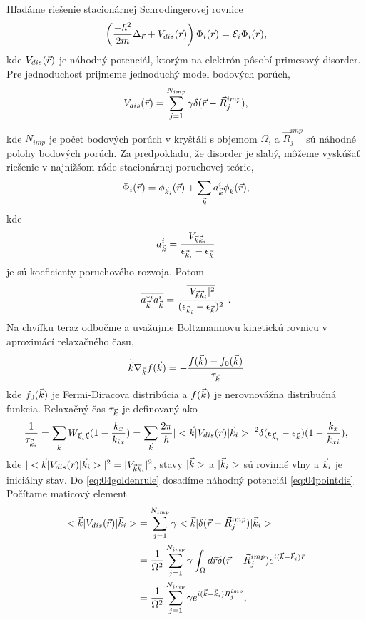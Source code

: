 Hľadáme riešenie stacionárnej Schrodingerovej rovnice
\begin{equation}
\label{eq:04SchrDis2stac}
\left(\frac{-\hbar^2}{2m}\Delta_{\vec{r}} + V_{dis}(\vec{r})\right)\Phi_i(\vec{r}) = \mathcal{E}_i \Phi_{i}(\vec{r})
  \text{,}
\end{equation}
kde $V_{dis}(\vec{r})$ je náhodný potenciál, ktorým na elektrón pôsobí primesový disorder. Pre jednoduchosť prijmeme jednoduchý model bodových porúch,
\begin{align}
\label{eq:04pointdis}
V_{dis}(\vec{r})=\sum_{j=1}^{N_{imp}}\gamma \delta(\vec{r}-\vec R_j^{imp})\text{,}
\end{align}
kde $N_{imp}$ je počet bodových porúch v kryštáli s objemom $\Omega$, a $\vec R^{imp}_j$ sú náhodné polohy bodových porúch.
Za predpokladu, že disorder je slabý, môžeme vyskúšať riešenie v najnižšom ráde stacionárnej poruchovej teórie,
\begin{align}
\label{nulta}
\Phi_i(\vec{r})=\phi_{\vec{k}_i}(\vec{r})+\sum_{\vec{k}} a^i_{\vec{k}} \phi_{\vec{k}}(\vec{r})\text{,}
\end{align}
kde
\begin{equation}
\label{eq:04SchrDis2stac}
a^i_{\vec{k}} = \frac{V_{\vec{k}\vec{k}_i}}{\epsilon_{\vec{k}_i}-\epsilon_{\vec{k}}}
\end{equation}
je sú koeficienty poruchového rozvoja. Potom
\begin{align}
\label{eq:04coef}
\overline{a^{*i}_{\vec{k}}a^i_{\vec{k}}}=
\frac{\overline{|V_{\vec{k}\vec{k}_i}|^2}}{(\epsilon_{\vec{k}_i}-\epsilon_{\vec{k}})^2}
\ \text{.}
\end{align}
Na chvíľku teraz odbočme a uvažujme Boltzmannovu kinetickú rovnicu v aproximácí relaxačného času,
\begin{align}
\dot{\vec{k}}\nabla_{\vec{k}}f(\vec{k})=-\frac{f(\vec{k})-f_0(\vec{k})}{\tau_{\vec{k}}}
\end{align}
kde $f_0(\vec{k})$ je Fermi-Diracova distribúcia a $f(\vec{k})$ je nerovnovážna distribučná funkcia. Relaxačný čas  $\tau_{\vec{k}}$ je definovaný ako
\begin{align}
\label{eq:04goldenrule}
\frac{1}{\tau_{\vec{k}_i}}=\sum_{\vec{k}}W_{\vec{k}_i\vec{k}}(1-\frac{k_x}{k_{ix}}) = \sum_{\vec{k}}\frac{2\pi}{\hbar}|<\vec{k}|V_{dis}(\vec{r})|\vec{k}_i>|^2\delta(\epsilon_{\vec{k}_i}-\epsilon_{\vec{k}})(1-\frac{k_x}{k_{xi}}) \text{,}
\end{align}
kde $|<\vec{k}|V_{dis}(\vec{r})|\vec{k}_i>|^2=|V_{\vec{k}\vec{k}_i}|^2$,
 stavy $|\vec{k}>$ a $|\vec{k}_i>$ sú rovinné vlny  a  $\vec{k}_i$ je iniciálny stav.
Do \eqref{eq:04goldenrule} dosadíme náhodný potenciál \eqref{eq:04pointdis}
Počítame maticový element
\begin{align}
\label{eq:04vdisElement}
\notag
<\vec{k}|V_{dis}(\vec{r})|\vec{k}_i>&=\sum_{j=1}^{N_{imp}}\gamma<\vec{k}|\delta(\vec{r}-\vec R^{imp}_j)|\vec{k}_i>\\
\notag
&=\frac{1}{\Omega^2}\sum_{j=1}^{N_{imp}}\gamma\int_{\Omega}d\vec{r}\delta(\vec{r} -\vec R_j^{imp})e^{i(\vec{k}-\vec{k}_i)\vec{r}}\\
&=\frac{1}{\Omega^2}\sum_{j=1}^{N_{imp}}\gamma e^{i(\vec{k}-\vec{k}_i)R_j^{imp}} \text{,}
\end{align}
